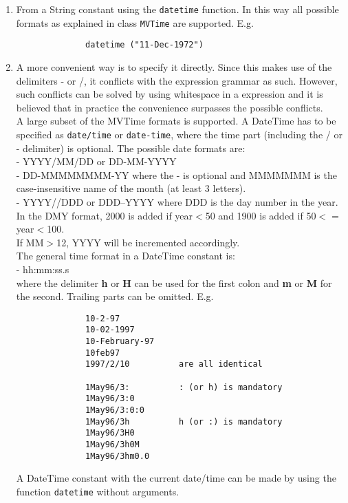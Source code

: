 \begin{itemize}
\begin{enumerate}
         \item From a String constant using the \texttt{datetime} function.
              In this way all possible formats as explained in class
              \texttt{MVTime} are supported. E.g.
              \begin{verbatim}
              datetime ("11-Dec-1972")
              \end{verbatim}
         \item A more convenient way is to specify it directly. Since this
              makes use of the delimiters - or /, it conflicts with the
              expression grammar as such. However, such conflicts can be
              solved by using whitespace in a expression and it is believed
              that in practice the convenience surpasses the possible
              conflicts.
              \\A large subset of the MVTime formats is supported.
              A DateTime has to be specified as \texttt{date/time}
              or \texttt{date-time}, where the time part (including
              the / or - delimiter) is optional.
              The possible date formats are:
              \\- YYYY/MM/DD or DD-MM-YYYY
              \\- DD-MMMMMMMM-YY where the - is optional and MMMMMMM is the
              case-insensitive name of the month (at least 3 letters).
              \\- YYYY//DDD or DDD--YYYY where DDD is the day number in
              the year.
              \\In the DMY format, 2000 is added if year$<$50 and
              1900 is added if 50$<=$year$<$100.
              \\If MM$>$12, YYYY will be incremented accordingly.
              \\The general time format in a DateTime constant is:
              \\- hh:mm:ss.s
              \\where the delimiter \textbf{h} or \textbf{H} can be used
              for the first colon and \textbf{m} or \textbf{M} for the second.
              Trailing parts can be omitted. E.g.
              \begin{verbatim}
              10-2-97
              10-02-1997
              10-February-97
              10feb97
              1997/2/10          are all identical

              1May96/3:          : (or h) is mandatory
              1May96/3:0
              1May96/3:0:0
              1May96/3h          h (or :) is mandatory
              1May96/3H0
              1May96/3h0M
              1May96/3hm0.0
              \end{verbatim}
              A DateTime constant with the current date/time can be made
              by using the function \texttt{datetime} without arguments.
       \end{enumerate}
\end{itemize}
